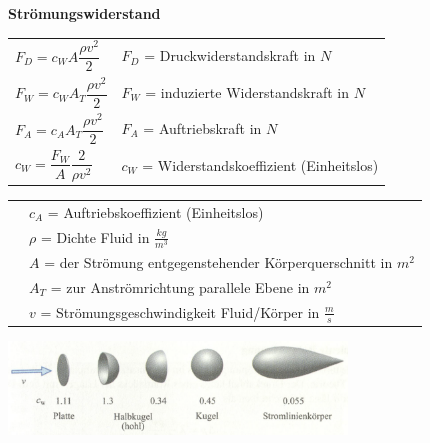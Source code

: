 				\begin{minipage}{10.1cm}
					\textbf{Strömungswiderstand}
						\begin{flushleft}
						\end{flushleft}
						\renewcommand{\arraystretch}{2.5}
						\begin{tabular}{ p{3cm} | p{10cm}}
							$F_D = c_W A \dfrac{\rho v^2}{2}$	&	$F_D$ = Druckwiderstandskraft in $N$\\
							$F_W = c_W A_T \dfrac{\rho v^2}{2}$	&	$F_W$ = induzierte Widerstandskraft in $N$\\
							$F_A = c_A A_T \dfrac{\rho v^2}{2}$	&	$F_A$ = Auftriebskraft in $N$\\
							$c_W = \dfrac{F_W}{A}\dfrac{2}{\rho v^2}$	&	$c_W$ = Widerstandskoeffizient (Einheitslos)\\
						\end{tabular}
						\renewcommand{\arraystretch}{1.5}
						\begin{tabular}{ p{3cm} | p{10cm} }
							& $c_A$ = Auftriebskoeffizient (Einheitslos)\\
							& $\rho$ = Dichte Fluid in $\frac{kg}{m^3}$\\
							& $A$ = der Strömung entgegenstehender Körperquerschnitt in $m^2$\\
							& $A_T$ = zur Anströmrichtung parallele Ebene in $m^2$\\
							& $v$ = Strömungsgeschwindigkeit Fluid/Körper in $\frac{m}{s}$\\
						\end{tabular} 
						\renewcommand{\arraystretch}{1}
				\end{minipage}
				\begin{minipage}{10cm}
					\vspace{-\ht\strutbox}\includegraphics[width=9cm]{./bilder/WiderstandkoeffizientBeispiele.png}
				\end{minipage}
			
